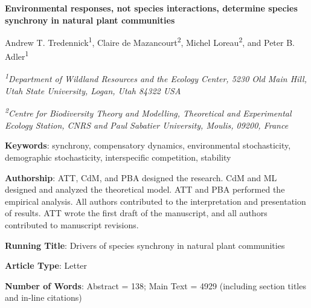 \documentclass[12pt,]{article}
\title{}
\author{}
\date{}
\begin{document}
\maketitle


\begin{singlespace}

\begin{center}
\large{\textbf{Environmental responses, not species interactions, determine species synchrony in natural plant communities}}

\renewcommand*{\thefootnote}{\fnsymbol{footnote}}

\vspace{1em}

\normalsize{Andrew T. Tredennick\textsuperscript{1}, Claire de Mazancourt\textsuperscript{2}, Michel Loreau\textsuperscript{2}, and Peter B. Adler\textsuperscript{1}}

\vspace{1em}

\textit{\small{\textsuperscript{1}Department of Wildland Resources and the Ecology Center, 5230 Old Main Hill, Utah State University, Logan, Utah 84322 USA}}

\textit{\small{\textsuperscript{2}Centre for Biodiversity Theory and Modelling, Theoretical and Experimental Ecology Station, CNRS and Paul Sabatier University, Moulis, 09200, France}}

\end{center}

\vspace{2em}

\textbf{Keywords}: synchrony, compensatory dynamics, environmental stochasticity, demographic stochasticity, interspecific competition, stability

\vspace{2em}

\textbf{Authorship}: ATT, CdM, and PBA designed the research. CdM and ML designed and analyzed the theoretical model. ATT and PBA performed the empirical analysis. All authors contributed to the interpretation and presentation of results. ATT wrote the first draft of the manuscript, and all authors contributed to manuscript revisions.

\textbf{Running Title}: Drivers of species synchrony in natural plant communities

\textbf{Article Type}: Letter

\textbf{Number of Words}: Abstract = 138; Main Text = 4929 (including section titles and in-line citations)


\end{singlespace}
\end{document}
